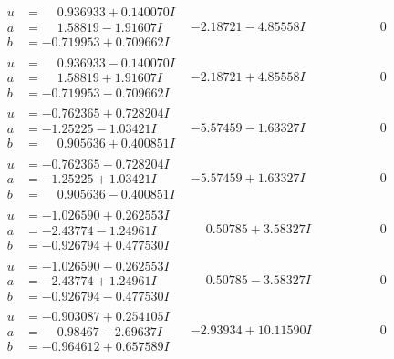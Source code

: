 \documentclass[1p]{elsarticle_modified}
\theoremstyle{definition}
\begin{document}
$$\begin{array}{c|c|c}
\begin{aligned}
u &= \phantom{-}0.936933 + 0.140070 I \\
a &= \phantom{-}1.58819 - 1.91607 I \\
b &= -0.719953 + 0.709662 I\end{aligned}
 & -2.18721 - 4.85558 I & \phantom{-0.000000 } 0 \\ \hline\begin{aligned}
u &= \phantom{-}0.936933 - 0.140070 I \\
a &= \phantom{-}1.58819 + 1.91607 I \\
b &= -0.719953 - 0.709662 I\end{aligned}
 & -2.18721 + 4.85558 I & \phantom{-0.000000 } 0 \\ \hline\begin{aligned}
u &= -0.762365 + 0.728204 I \\
a &= -1.25225 - 1.03421 I \\
b &= \phantom{-}0.905636 + 0.400851 I\end{aligned}
 & -5.57459 - 1.63327 I & \phantom{-0.000000 } 0 \\ \hline\begin{aligned}
u &= -0.762365 - 0.728204 I \\
a &= -1.25225 + 1.03421 I \\
b &= \phantom{-}0.905636 - 0.400851 I\end{aligned}
 & -5.57459 + 1.63327 I & \phantom{-0.000000 } 0 \\ \hline\begin{aligned}
u &= -1.026590 + 0.262553 I \\
a &= -2.43774 - 1.24961 I \\
b &= -0.926794 + 0.477530 I\end{aligned}
 & \phantom{-}0.50785 + 3.58327 I & \phantom{-0.000000 } 0 \\ \hline\begin{aligned}
u &= -1.026590 - 0.262553 I \\
a &= -2.43774 + 1.24961 I \\
b &= -0.926794 - 0.477530 I\end{aligned}
 & \phantom{-}0.50785 - 3.58327 I & \phantom{-0.000000 } 0 \\ \hline\begin{aligned}
u &= -0.903087 + 0.254105 I \\
a &= \phantom{-}0.98467 - 2.69637 I \\
b &= -0.964612 + 0.657589 I\end{aligned}
 & -2.93934 + 10.11590 I & \phantom{-0.000000 } 0 \\ \hline\begin{aligned}

\end{aligned}
\end{array}$$
\end{document}

